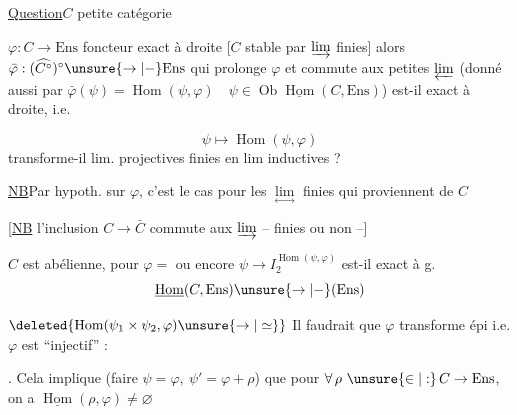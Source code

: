 
\uline{Question}\qquad $C$ petite catégorie

$\varphi:C\longrightarrow\mathrm{Ens}$ foncteur exact à droite [$C$ stable par $\varinjlim$ finies] alors $\bar\varphi:(\widehat{C^\circ})^\circ\unsure{\to|{-}}\mathrm{Ens}$ qui prolonge $\varphi$ et commute aux petites $\varprojlim$ (donné aussi par $\bar\varphi(\psi)=\operatorname{Hom}(\psi,\varphi)\quad\psi\in\operatorname{Ob}\underline{\operatorname{Hom}}(C,\mathrm{Ens})$) est-il exact à droite, i.e.


\[\psi\longmapsto\operatorname{Hom}(\psi,\varphi)\]
transforme-il lim. projectives finies en lim inductives ?

\uline{NB}\quad Par hypoth. sur $\varphi$, c'est le cas pour les $\underset{\longleftrightarrow}{\lim}$ finies qui proviennent de $C$

[\uline{NB} l'inclusion $C\to\bar C$ commute aux $\varinjlim$  -- finies ou non --]

 $C$ est  abélienne, pour $\varphi=$ ou encore $\psi\to I_2^{\operatorname{Hom}(\psi,\varphi)}$ est-il exact à g.
\[\underline{\operatorname{Hom}}(C,\mathrm{Ens})\unsure{\to|{-}}(\mathrm{Ens})\]

$\deleted{\operatorname{Hom}(\psi_1\times\psi_2,\varphi)\unsure{\to|\simeq}}$ Il faudrait que $\varphi$ transforme    épi i.e. $\varphi$ est ``injectif'' :


. Cela implique (faire $\psi=\varphi,\ \psi'=\varphi+\rho$) que pour $\forall\,\rho\ \unsure{\in|:}\, C\to\mathrm{Ens}$, on a $\underline{\operatorname{Hom}}(\rho,\varphi)\ne\varnothing$

